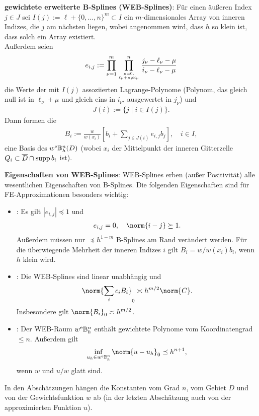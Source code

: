\textbf{gewichtete erweiterte B-Splines (WEB-Splines)}:
Für einen äußeren Index $j \in J$ sei $I(j) := \ell + \{0, \dotsc, n\}^m \subset I$ ein
$m$-dimensionales Array von inneren Indizes, die $j$ am nächsten liegen,
wobei angenommen wird, dass $h$ so klein ist, dass solch ein Array existiert.\\
Außerdem seien
\begin{align*}
    e_{i,j} := \prod_{\nu=1}^m \prod_{\genfrac{}{}{0pt}{}{\mu=0,}{\ell_\nu+\mu\not=i_\nu}}^n
    \frac{j_\nu - \ell_\nu - \mu}{i_\nu-\ell_\nu-\mu}
\end{align*}
die Werte der mit $I(j)$ assoziierten Lagrange-Polynome
(Polynom, das gleich null ist in $\ell_\nu + \mu$ und gleich eins in $i_\nu$,
ausgewertet in $j_\nu$) und
\begin{align*}
    J(i) := \{j \;|\; i \in I(j)\}.
\end{align*}
Dann formen die 
\begin{align*}
    B_i := \frac{w}{w(x_i)} \left[b_i + \sum_{j \in J(i)} e_{i,j} b_j\right],\quad i \in I,
\end{align*}
eine Basis des  $w^{\mathrm{e}}\mathbb{B}_h^n(D)$
(wobei $x_i$ der Mittelpunkt der inneren Gitterzelle\\
$Q_i \subset \overline{D} \cap \operatorname{supp} b_i$ ist).

\linie
\pagebreak

\textbf{Eigenschaften von WEB-Splines}:
WEB-Splines erben (außer Positivität) alle wesentlichen Eigenschaften von B-Splines.
Die folgenden Eigenschaften sind für FE-Approximationen besonders wichtig:
\begin{itemize}
    \item
    :
    Es gilt $|e_{i,j}| \preceq 1$ und
    \begin{align*}
        e_{i,j} = 0,\quad
        \norm{i - j} \succeq 1.
    \end{align*}
    Außerdem müssen nur $\preceq h^{1-m}$ B-Splines am Rand verändert werden.
    Für die überwiegende
    Mehrheit der inneren Indizes $i$ gilt $B_i = w/w(x_i) b_i$, wenn $h$ klein wird.

    \item
    :
    Die WEB-Splines sind linear unabhängig und
    \begin{align*}
        \norm{\sum_i c_i B_i}_0 \asymp h^{m/2} \norm{C}.
    \end{align*}
    Insbesondere gilt $\norm{B_i}_0 \asymp h^{m/2}$.

    \item
    :
    Der WEB-Raum $w^{\mathrm{e}}\mathbb{B}_h^n$ enthält gewichtete Polynome vom Koordinatengrad $\le n$.
    Außerdem gilt
    \begin{align*}
        \inf_{u_h \in w^\e\BB_h^n} \norm{u - u_h}_0 \preceq h^{n+1},
    \end{align*}
    wenn $w$ und $u/w$ glatt sind.
\end{itemize}
In den Abschätzungen hängen die Konstanten vom Grad $n$, vom Gebiet $D$ und von der
Gewichtsfunktion $w$ ab (in der letzten Abschätzung auch von der approximierten
Funktion $u$).

